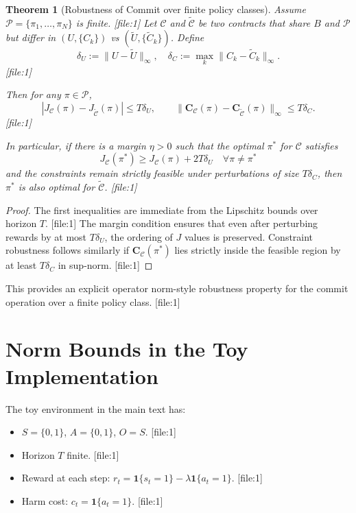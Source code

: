 \documentclass[11pt,a4paper]{article}
\theoremstyle{tealstyle}
\newtheorem{theorem}{Theorem}[section]
\theoremstyle{definition}
\begin{document}
\begin{theorem}[Robustness of Commit over finite policy classes]
Assume \(\mathcal{P} = \{\pi_1,\dots,\pi_N\}\) is finite. [file:1] Let \(\mathcal{C}\) and \(\tilde{\mathcal{C}}\) be two contracts that share \(B\) and \(\mathcal{P}\) but differ in \((U,\{C_k\})\) vs \((\tilde{U},\{\tilde{C}_k\})\). Define 
\[
  \delta_U := \|U - \tilde{U}\|_\infty, \quad
  \delta_{C} := \max_k \|C_k - \tilde{C}_k\|_\infty.
\] [file:1]

Then for any \(\pi \in \mathcal{P}\),
\[
  |J_{\mathcal{C}}(\pi) - J_{\tilde{\mathcal{C}}}(\pi)| \le T \delta_U, \qquad
  \|\mathbf{C}_{\mathcal{C}}(\pi) - \mathbf{C}_{\tilde{\mathcal{C}}}(\pi)\|_\infty \le T \delta_C.
\] [file:1]

In particular, if there is a margin \(\eta > 0\) such that the optimal \(\pi^*\) for \(\mathcal{C}\) satisfies
\[
  J_{\mathcal{C}}(\pi^*) \ge J_{\mathcal{C}}(\pi) + 2 T \delta_U \quad \forall \pi \ne \pi^*
\]
and the constraints remain strictly feasible under perturbations of size \(T \delta_C\), then \(\pi^*\) is also optimal for \(\tilde{\mathcal{C}}\). [file:1]
\end{theorem}

\begin{proof}
The first inequalities are immediate from the Lipschitz bounds over horizon \(T\). [file:1] The margin condition ensures that even after perturbing rewards by at most \(T\delta_U\), the ordering of \(J\) values is preserved. Constraint robustness follows similarly if \(\mathbf{C}_{\mathcal{C}}(\pi^*)\) lies strictly inside the feasible region by at least \(T\delta_C\) in sup-norm. [file:1]
\end{proof}

This provides an explicit operator norm-style robustness property for the commit operation over a finite policy class. [file:1]

\section{Norm Bounds in the Toy Implementation}

The toy environment in the main text has:

\begin{itemize}[noitemsep]
  \item \(S = \{0,1\}\), \(A = \{0,1\}\), \(O = S\). [file:1]
  \item Horizon \(T\) finite. [file:1]
  \item Reward at each step: \(r_t = \mathbf{1}\{s_t = 1\} - \lambda \mathbf{1}\{a_t = 1\}\). [file:1]
  \item Harm cost: \(c_t = \mathbf{1}\{a_t = 1\}\). [file:1]
\end{itemize}
\end{document}
